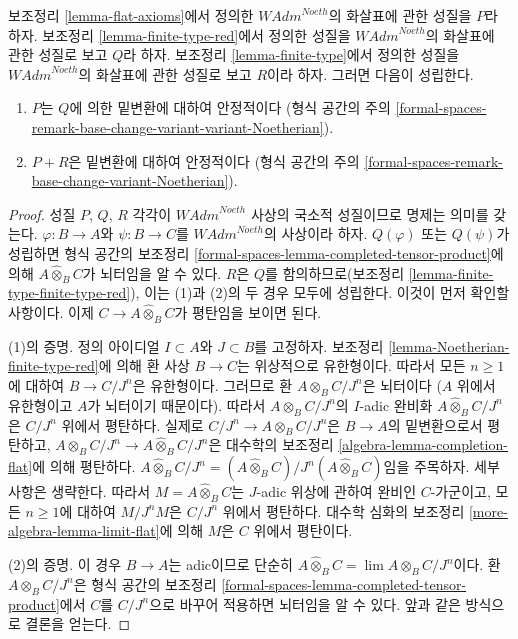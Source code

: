 \begin{lemma}
\label{lemma-base-change-flat-continuous}
보조정리 \ref{lemma-flat-axioms}에서 정의한
$\textit{WAdm}^{Noeth}$의 화살표에 관한 성질을 $P$라 하자.
보조정리 \ref{lemma-finite-type-red}에서 정의한 성질을
$\textit{WAdm}^{Noeth}$의 화살표에 관한 성질로 보고 $Q$라 하자.
보조정리 \ref{lemma-finite-type}에서 정의한 성질을
$\textit{WAdm}^{Noeth}$의 화살표에 관한 성질로 보고 $R$이라 하자.
그러면 다음이 성립한다.
\begin{enumerate}
\item $P$는 $Q$에 의한 밑변환에 대하여 안정적이다
(형식 공간의 주의
\ref{formal-spaces-remark-base-change-variant-variant-Noetherian}).
\item $P + R$은 밑변환에 대하여 안정적이다
(형식 공간의 주의
\ref{formal-spaces-remark-base-change-variant-Noetherian}).
\end{enumerate}
\end{lemma}

\begin{proof}
성질 $P$, $Q$, $R$ 각각이 $\textit{WAdm}^{Noeth}$ 사상의
국소적 성질이므로 명제는 의미를 갖는다.
$\varphi : B \to A$와 $\psi : B \to C$를
$\textit{WAdm}^{Noeth}$의 사상이라 하자.
$Q(\varphi)$ 또는 $Q(\psi)$가 성립하면 형식 공간의 보조정리
\ref{formal-spaces-lemma-completed-tensor-product}에 의해
$A \widehat{\otimes}_B C$가 뇌터임을 알 수 있다.
$R$은 $Q$를 함의하므로(보조정리
\ref{lemma-finite-type-finite-type-red}), 이는 (1)과 (2)의 두 경우 모두에 성립한다.
이것이 먼저 확인할 사항이다. 이제
$C \to A \widehat{\otimes}_B C$가 평탄임을 보이면 된다.

\medskip\noindent
(1)의 증명. 정의 아이디얼 $I \subset A$와 $J \subset B$를 고정하자.
보조정리 \ref{lemma-Noetherian-finite-type-red}에 의해 환 사상
$B \to C$는 위상적으로 유한형이다. 따라서 모든 $n \geq 1$에 대하여
$B \to C/J^n$은 유한형이다. 그러므로 환
$A \otimes_B C/J^n$은 뇌터이다
($A$ 위에서 유한형이고 $A$가 뇌터이기 때문이다).
따라서 $A \otimes_B C/J^n$의 $I$-adic 완비화
$A \widehat{\otimes}_B C/J^n$은 $C/J^n$ 위에서 평탄하다.
실제로 $C/J^n \to A \otimes_B C/J^n$은
$B \to A$의 밑변환으로서 평탄하고,
$A \otimes_B C/J^n \to A \widehat{\otimes}_B C/J^n$은
대수학의 보조정리 \ref{algebra-lemma-completion-flat}에 의해 평탄하다.
$A \widehat{\otimes}_B C/J^n =
(A \widehat{\otimes}_B C)/J^n(A \widehat{\otimes}_B C)$임을 주목하자.
세부 사항은 생략한다. 따라서 $M = A \widehat{\otimes}_B C$는
$J$-adic 위상에 관하여 완비인 $C$-가군이고,
모든 $n \geq 1$에 대하여 $M/J^nM$은 $C/J^n$ 위에서 평탄하다.
대수학 심화의 보조정리 \ref{more-algebra-lemma-limit-flat}에 의해
$M$은 $C$ 위에서 평탄이다.

\medskip\noindent
(2)의 증명. 이 경우 $B \to A$는 adic이므로 단순히
$A \widehat{\otimes}_B C = \lim A \otimes_B C/J^n$이다.
환 $A \otimes_B C/J^n$은 형식 공간의 보조정리
\ref{formal-spaces-lemma-completed-tensor-product}에서
$C$를 $C/J^n$으로 바꾸어 적용하면 뇌터임을 알 수 있다.
앞과 같은 방식으로 결론을 얻는다.
\end{proof}

